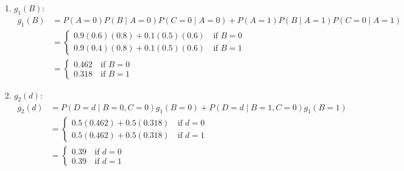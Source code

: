 \begin{example}
\begin{enumerate}
\begin{enumerate}
            \item \( g_1(B) \):
            \begin{align*}
                g_1(B) &= P(A=0)P(B \mid A=0) P(C=0 \mid A=0) + P(A=1)P(B \mid A=1) P(C=0 \mid A=1) \\
                &= \begin{cases}
                    0.9(0.6)(0.8) + 0.1(0.5)(0.6) \quad \text{if } B=0 \\
                    0.9(0.4)(0.8) + 0.1(0.5)(0.6) \quad \text{if } B=1
                \end{cases} \\
                &= \begin{cases}
                    0.462 \quad \text{if } B=0 \\
                    0.318 \quad \text{if } B=1
                \end{cases} 
            \end{align*}
            
            \item \( g_2(d) \): 
            \begin{align*}
                g_2(d) &= P(D=d \mid B=0, C=0) g_1(B=0) + P(D=d \mid B=1, C=0)g_1(B=1) \\
                &= \begin{cases}
                    0.5(0.462) + 0.5(0.318) \quad \text{if } d=0 \\
                    0.5(0.462) + 0.5(0.318) \quad \text{if } d=1
                \end{cases} \\
                &= \begin{cases}
                    0.39 \quad \text{if } d=0 \\
                    0.39 \quad \text{if } d=1
                \end{cases} 
            \end{align*}
            

\end{enumerate}
\end{enumerate}
\end{example}

